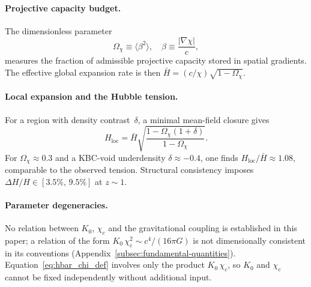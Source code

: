   \paragraph{Projective capacity budget.}
    The dimensionless parameter
    \begin{equation}
      \Omega_\chi \equiv \langle \beta^2 \rangle,
      \quad
      \beta \equiv \frac{|\nabla \chi|}{c},
      \label{eq:chi-projective-budget}
    \end{equation}
    measures the fraction of admissible projective capacity stored in spatial
    gradients.
    The effective global expansion rate is then
    $\bar{H} = (c/\chi)\sqrt{1 - \Omega_\chi}$.

  \paragraph{Local expansion and the Hubble tension.}
    For a region with density contrast~$\delta$, a minimal mean-field
    closure gives
    \begin{equation}
      H_{\mathrm{loc}}
      = \bar{H}
      \sqrt{
        \frac{1 - \Omega_\chi(1+\delta)}
        {1 - \Omega_\chi}
      }.
      \label{eq:hubble_local}
    \end{equation}
    For $\Omega_\chi \approx 0.3$ and a KBC-void underdensity
    $\delta \approx -0.4$, one finds
    $H_{\mathrm{loc}}/\bar{H} \approx 1.08$, comparable to the observed
    tension.
    Structural consistency imposes
    $\Delta H / H \in [3.5\%,\,9.5\%]$ at $z \sim 1$.

  \paragraph{Parameter degeneracies.}
    No relation between $K_0$, $\chi_c$ and the gravitational coupling is established in this paper;
    a relation of the form $K_0\,\chi_c^2 \sim c^4/(16\pi G)$ is not dimensionally consistent in its conventions
    (Appendix~\ref{subsec:fundamental-quantities}).
    Equation~\eqref{eq:hbar_chi_def} involves only the product $K_0\,\chi_c$, so $K_0$ and $\chi_c$ cannot be
    fixed independently without additional input.

